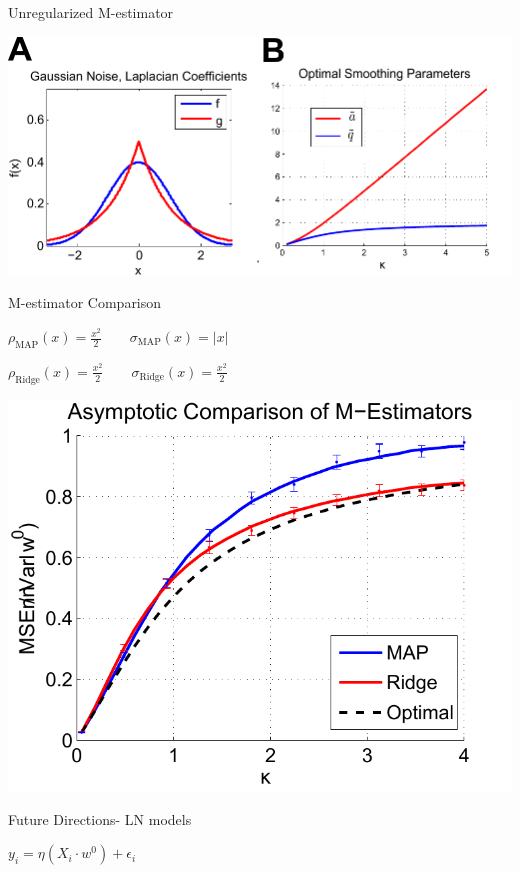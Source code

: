 \documentclass[pdf]{beamer}
\begin{document}
\begin{frame}{Unregularized M-estimator}


        \begin{center}
            \includegraphics[width = .7\linewidth]{regularizedPlots.pdf}
        \end{center}


\end{frame}


\begin{frame}{M-estimator Comparison}


\begin{center}
    $\rho_{\text{MAP}}(x) = \frac{x^2}{2} \quad\quad \sigma_{\text{MAP}}(x) = |x|$

    $ \rho_{\text{Ridge}}(x) = \frac{x^2}{2} \quad\quad \sigma_{\text{Ridge}}(x) = \frac{x^2}{2}$
\end{center}


\vspace{.1in}
        \begin{center}
            \includegraphics[width = .55\linewidth]{CompareM_est_redo.pdf}
        \end{center}
\end{frame}




\begin{frame}{Future Directions- LN models}

$y_i = \eta(X_i \cdot w^0) + \epsilon_i$


\end{frame}
\end{document}
